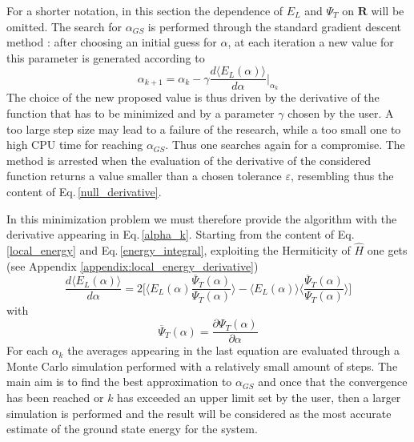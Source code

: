 For a shorter notation, in this section the dependence of $E_L$ and $\Psi_T$ on $\bm{R}$ will be omitted. The search for $\alpha_{GS}$ is performed through the standard gradient descent method \cite{painless}: after choosing an initial guess for $\alpha$, at each iteration a new value for this parameter is generated according to
\begin{equation}
    \alpha_{k+1} = \alpha_{k} - \gamma \frac{d \langle E_L(\alpha) \rangle}{d\alpha} \bigg\vert_{\alpha_k}
    \label{alpha_k}
\end{equation}
The choice of the new proposed value is thus driven by the derivative of the function that has to be minimized and by a parameter $\gamma$ chosen by the user. A too large step size may lead to a failure of the research, while a too small one to high CPU time for reaching $\alpha_{GS}$. Thus one searches again for a compromise. The method is arrested when the evaluation of the derivative of the considered function returns a value smaller than a chosen tolerance $\varepsilon$, resembling thus the content of Eq.\,\ref{null_derivative}. 

In this minimization problem we must therefore provide the algorithm with the derivative appearing in Eq.\,\ref{alpha_k}. Starting from the content of Eq.\,\ref{local_energy} and Eq.\,\ref{energy_integral}, exploiting the Hermiticity of $\hat{H}$ one gets (see Appendix \ref{appendix:local_energy_derivative})
\begin{equation}
    \frac{d\langle E_L(\alpha) \rangle}{d\alpha} = 2 \bigg[ \bigg\langle E_L(\alpha) \frac{\overline{\Psi}_T(\alpha)}{\Psi_T(\alpha)} \bigg\rangle - \langle E_L(\alpha) \rangle \bigg\langle \frac{\overline{\Psi}_T(\alpha)}{\Psi_T(\alpha)}\bigg\rangle \bigg]
    \label{dEnergy_dalpha}
\end{equation}
with 
\begin{equation*}
    \overline{\Psi}_T(\alpha) = \frac{\partial  \Psi_T(\alpha)}{\partial \alpha}
\end{equation*}
For each $\alpha_k$ the averages appearing in the last equation are evaluated through a Monte Carlo simulation performed with a relatively small amount of steps. The main aim is to find the best approximation to $\alpha_{GS}$ and once that the convergence has been reached or $k$ has exceeded an upper limit set by the user, then a larger simulation is performed and the result will be considered as the most accurate estimate of the ground state energy for the system. 

